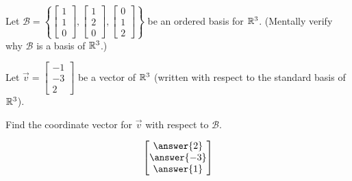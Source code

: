 \documentclass{ximera}
\author{Anna Davis}
\begin{document}
\begin{exercise}
Let $\mathcal{B}=\left\{ \begin{bmatrix}1\\1\\0\end{bmatrix}, \begin{bmatrix}1\\2\\0\end{bmatrix}, \begin{bmatrix}0\\1\\2\end{bmatrix}\right\}$ be an ordered basis for $\mathbb{R}^3$.  (Mentally verify why $\mathcal{B}$ is a basis of $\mathbb{R}^3$.)

Let $\vec{v}=\begin{bmatrix}-1\\-3\\2\end{bmatrix}$ be a vector of $\mathbb{R}^3$ (written with respect to the standard basis of $\mathbb{R}^3$).

Find the coordinate vector for $\vec{v}$ with respect to $\mathcal{B}$.

$$\begin{bmatrix}\answer{2}\\\answer{-3}\\\answer{1}\end{bmatrix}$$
\end{exercise}
\end{document}
